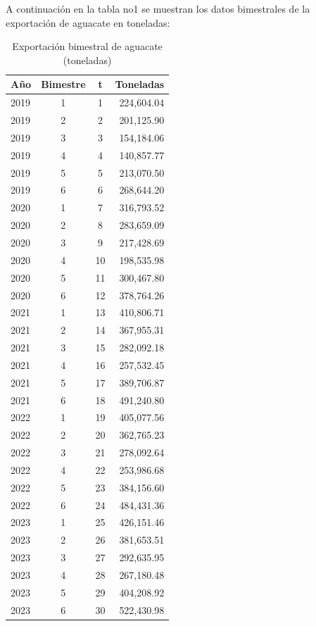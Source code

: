 \documentclass[10pt]{article}
\begin{document}
  A continuación en la tabla no1 se muestran los datos bimestrales de la exportación de aguacate en toneladas:
\begin{table}[H]
  \centering
  \caption{Exportación bimestral de aguacate (toneladas)}
  \label{tab:export_avocado}
  \begin{tabular}{l c c r}
  \hline
  \textbf{Año} & \textbf{Bimestre} & \textbf{t} & \textbf{Toneladas} \\
  \hline
    2019 & 1 & 1  & 224,604.04 \\
    2019 & 2 & 2  & 201,125.90 \\
    2019 & 3 & 3  & 154,184.06 \\
    2019 & 4 & 4  & 140,857.77 \\
    2019 & 5 & 5  & 213,070.50 \\
    2019 & 6 & 6  & 268,644.20 \\
    2020 & 1 & 7  & 316,793.52 \\
    2020 & 2 & 8  & 283,659.09 \\
    2020 & 3 & 9  & 217,428.69 \\
    2020 & 4 & 10 & 198,535.98 \\
    2020 & 5 & 11 & 300,467.80 \\
    2020 & 6 & 12 & 378,764.26 \\
    2021 & 1 & 13 & 410,806.71 \\
    2021 & 2 & 14 & 367,955.31 \\
    2021 & 3 & 15 & 282,092.18 \\
    2021 & 4 & 16 & 257,532.45 \\
    2021 & 5 & 17 & 389,706.87 \\
    2021 & 6 & 18 & 491,240.80 \\
    2022 & 1 & 19 & 405,077.56 \\
    2022 & 2 & 20 & 362,765.23 \\
    2022 & 3 & 21 & 278,092.64 \\
    2022 & 4 & 22 & 253,986.68 \\
    2022 & 5 & 23 & 384,156.60 \\
    2022 & 6 & 24 & 484,431.36 \\
    2023 & 1 & 25 & 426,151.46 \\
    2023 & 2 & 26 & 381,653.51 \\
    2023 & 3 & 27 & 292,635.95 \\
    2023 & 4 & 28 & 267,180.48 \\
    2023 & 5 & 29 & 404,208.92 \\
    2023 & 6 & 30 & 522,430.98 \\
  \hline
  \end{tabular}
\end{table}
\end{document}
